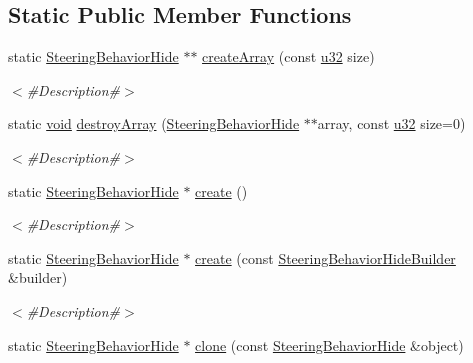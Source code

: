 \subsection*{Static Public Member Functions}
\begin{DoxyCompactItemize}
\item 
static \mbox{\hyperlink{classnjli_1_1_steering_behavior_hide}{Steering\+Behavior\+Hide}} $\ast$$\ast$ \mbox{\hyperlink{classnjli_1_1_steering_behavior_hide_a8fdf4ee83c8a30a75fdf06e111f621a3}{create\+Array}} (const \mbox{\hyperlink{_util_8h_a10e94b422ef0c20dcdec20d31a1f5049}{u32}} size)
\begin{DoxyCompactList}\small\item\em $<$\#\+Description\#$>$ \end{DoxyCompactList}\item 
static \mbox{\hyperlink{_thread_8h_af1e856da2e658414cb2456cb6f7ebc66}{void}} \mbox{\hyperlink{classnjli_1_1_steering_behavior_hide_a2b539ad0f2fb4f4758c56122f94f16e9}{destroy\+Array}} (\mbox{\hyperlink{classnjli_1_1_steering_behavior_hide}{Steering\+Behavior\+Hide}} $\ast$$\ast$array, const \mbox{\hyperlink{_util_8h_a10e94b422ef0c20dcdec20d31a1f5049}{u32}} size=0)
\begin{DoxyCompactList}\small\item\em $<$\#\+Description\#$>$ \end{DoxyCompactList}\item 
static \mbox{\hyperlink{classnjli_1_1_steering_behavior_hide}{Steering\+Behavior\+Hide}} $\ast$ \mbox{\hyperlink{classnjli_1_1_steering_behavior_hide_a1ab4df55dc2a32fd856bc918efe77eed}{create}} ()
\begin{DoxyCompactList}\small\item\em $<$\#\+Description\#$>$ \end{DoxyCompactList}\item 
static \mbox{\hyperlink{classnjli_1_1_steering_behavior_hide}{Steering\+Behavior\+Hide}} $\ast$ \mbox{\hyperlink{classnjli_1_1_steering_behavior_hide_a21d37096b86b4f1917a70bca836ff005}{create}} (const \mbox{\hyperlink{classnjli_1_1_steering_behavior_hide_builder}{Steering\+Behavior\+Hide\+Builder}} \&builder)
\begin{DoxyCompactList}\small\item\em $<$\#\+Description\#$>$ \end{DoxyCompactList}\item 
static \mbox{\hyperlink{classnjli_1_1_steering_behavior_hide}{Steering\+Behavior\+Hide}} $\ast$ \mbox{\hyperlink{classnjli_1_1_steering_behavior_hide_a4ba08fb5769667a6fa43d5ba3688ddd9}{clone}} (const \mbox{\hyperlink{classnjli_1_1_steering_behavior_hide}{Steering\+Behavior\+Hide}} \&object)

\end{DoxyCompactItemize}
